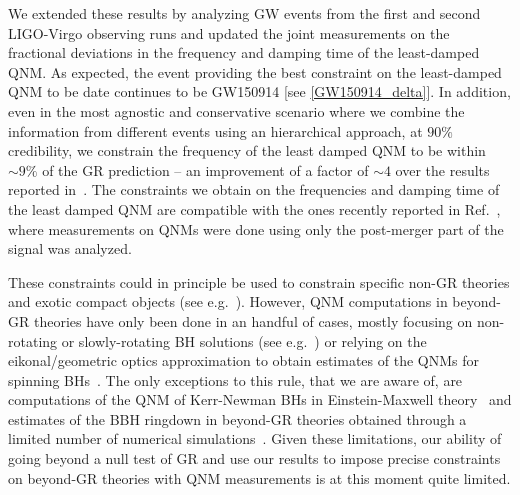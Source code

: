 
We extended these results by analyzing GW events from the first and
second LIGO-Virgo observing runs and updated the joint measurements on
the fractional deviations in the frequency and damping time of the
least-damped QNM. As expected, the event providing the best constraint
on the least-damped QNM to be date continues to be GW150914 [see
\eqref{GW150914_delta}]. In addition, even in the most agnostic and
conservative scenario where we combine the information from different
events using an hierarchical approach, at $90\%$ credibility, we
constrain the frequency of the least damped QNM to be within $\sim
9\%$ of the GR prediction -- an improvement of a factor of $\sim 4$
over the results reported in~\cite{Abbott:2020jks}. The constraints we
obtain on the frequencies and damping time of the least damped QNM are
compatible with the ones recently reported in
Ref.~\cite{Carullo:2021dui}, where measurements on QNMs were done
using only the post-merger part of the signal was analyzed.

These constraints could in principle be used to constrain specific
non-GR theories and exotic compact objects (see
e.g.~\cite{Glampedakis:2017cgd,Cardoso:2019rvt,Maggio:2020jml}). However,
QNM computations in beyond-GR theories have only been done in an
handful of cases, mostly focusing on non-rotating or slowly-rotating
BH solutions (see
e.g.~\cite{Ferrari:2000ep,Molina:2010fb,Pani:2009wy,Blazquez-Salcedo:2016enn,Blazquez-Salcedo:2017txk,Brito:2018hjh,Franciolini:2018uyq,Cardoso:2018ptl,Tattersall:2018nve,Tattersall:2019nmh,Blazquez-Salcedo:2019nwd,Silva:2019scu,Glampedakis:2019dqh,Blazquez-Salcedo:2020jee,Blazquez-Salcedo:2020caw,Cano:2020cao})
or relying on the eikonal/geometric optics approximation to obtain
estimates of the QNMs for spinning
BHs~\cite{Blazquez-Salcedo:2016enn,Glampedakis:2017dvb,Jai-akson:2017ldo}. The
only exceptions to this rule, that we are aware of, are computations
of the QNM of Kerr-Newman BHs in Einstein-Maxwell
theory~\cite{Pani:2013ija,Pani:2013wsa,Mark:2014aja,Dias:2015wqa} and
estimates of the BBH ringdown in beyond-GR theories obtained through a
limited number of numerical
simulations~\cite{Okounkova:2019dfo,Okounkova:2019zjf}. Given these
limitations, our ability of going beyond a null test of GR and use our
results to impose precise constraints on beyond-GR theories with QNM
measurements is at this moment quite limited.

